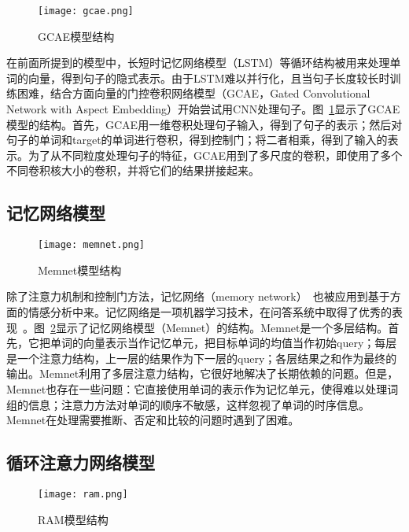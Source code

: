 \begin{figure}[ht]
    \centering 
    \texttt{[image: gcae.png]}
    \caption{GCAE模型结构}
    \label{fig:gcae}
\end{figure}

在前面所提到的模型中，长短时记忆网络模型（LSTM）等循环结构被用来处理单词的向量，得到句子的隐式表示。由于LSTM难以并行化，且当句子长度较长时训练困难，结合方面向量的门控卷积网络模型（GCAE，Gated Convolutional Network with Aspect Embedding）开始尝试用CNN\cite{krizhevsky2012imagenet,grefenstette2014convolutional}处理句子。图~\ref{fig:gcae}显示了GCAE模型的结构。首先，GCAE用一维卷积处理句子输入，得到了句子的表示；然后对句子的单词和target的单词进行卷积，得到控制门；将二者相乘，得到了输入的表示。为了从不同粒度处理句子的特征，GCAE用到了多尺度的卷积，即使用了多个不同卷积核大小的卷积，并将它们的结果拼接起来。

\subsection{记忆网络模型}

\begin{figure}[ht]
    \centering 
    \texttt{[image: memnet.png]}
    \caption{Memnet模型结构}
    \label{fig:memnet}
\end{figure}

除了注意力机制和控制门方法，记忆网络（memory network）~\cite{Weston2014Memory}也被应用到基于方面的情感分析中来。记忆网络是一项机器学习技术，在问答系统中取得了优秀的表现~\cite{Weston2014Memory,Sukhbaatar2015End}。图~\ref{fig:memnet}显示了记忆网络模型（Memnet）的结构。Memnet是一个多层结构。首先，它把单词的向量表示当作记忆单元，把目标单词的均值当作初始query；每层是一个注意力结构，上一层的结果作为下一层的query；各层结果之和作为最终的输出。Memnet利用了多层注意力结构，它很好地解决了长期依赖的问题。但是，Memnet也存在一些问题：它直接使用单词的表示作为记忆单元，使得难以处理词组的信息；注意力方法对单词的顺序不敏感，这样忽视了单词的时序信息。Memnet在处理需要推断、否定和比较的问题时遇到了困难。

\subsection{循环注意力网络模型}

\begin{figure}[ht]
    \centering 
    \texttt{[image: ram.png]}
    \caption{RAM模型结构}
    \label{fig:ram}
\end{figure}

